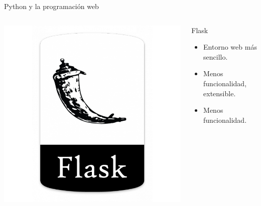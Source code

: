 \documentclass[bigger,unknownkeysallowed]{beamer}
\begin{document}
\begin{frame}[label={sec:org003f507}]{Python y la programación web}
\begin{columns}
\begin{column}{0.3\columnwidth}
\begin{center}
\begin{center}
\includegraphics[width=\textwidth]{flask.png}
\end{center}
\end{center}
\end{column}
\begin{column}{0.7\columnwidth}
\begin{block}{Flask}
\begin{itemize}
\item Entorno web más sencillo.

\item Menos funcionalidad, extensible.

\item Menos funcionalidad.
\end{itemize}
\end{block}
\end{column}
\end{columns}
\end{frame}
\end{document}
